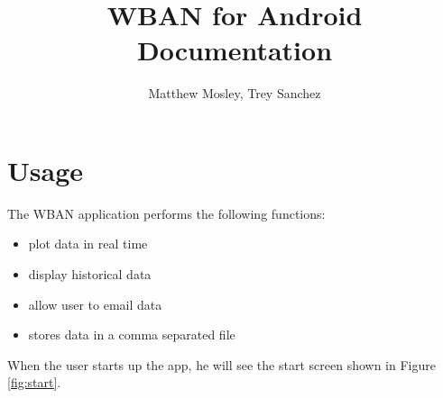 \documentclass{article}
\author{Matthew Mosley, Trey Sanchez}
\title{WBAN for Android Documentation}
\begin{document}
\maketitle

\def \WID {1.7in}
\section{Usage}
The WBAN application performs the following functions:

\begin{itemize}
\item plot data in real time
\item display historical data
\item allow user to email data
\item stores data in a comma separated file
\end{itemize}

When the user starts up the app, he will see the start screen shown in Figure \ref{fig:start}.
\end{document}

